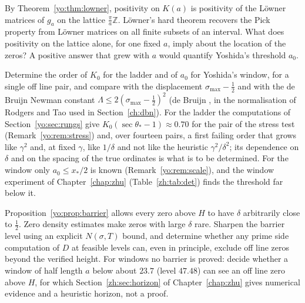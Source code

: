 \begin{problem}\label{yo:op:lowner}
By Theorem~\ref{yo:thm:lowner}, positivity on $K(a)$ is positivity of the L\"owner matrices of $g_a$ on the lattice $\frac\pi a\mathbb Z$. L\"owner's hard theorem \cite{Lowner34,Donoghue74} recovers the Pick property from L\"owner matrices on all finite subsets of an interval. What does positivity on the lattice alone, for one fixed $a$, imply about the location of the zeros? A positive answer that grew with $a$ would quantify Yoshida's threshold $a_0$.
\end{problem}

\begin{problem}\label{yo:op:orders}
Determine the order of $K_0$ for the ladder and of $a_0$ for Yoshida's window, for a single off line pair, and compare with the displacement $\sigma_{\max}-\frac12$ and with the de Bruijn Newman constant $\Lambda\le2(\sigma_{\max}-\frac12)^2$ (de Bruijn \cite{deBruijn}, in the normalisation of Rodgers and Tao \cite{RodgersTao} used in Section~\ref{ch:dbn}). For the ladder the computations of Section~\ref{yo:sec:rungs} give $K_0(\sec\theta_*-1)\approx0.70$ for the pair of the stress test (Remark~\ref{yo:rem:stress}) and, over fourteen pairs, a first failing order that grows like $\gamma^2$ and, at fixed $\gamma$, like $1/\delta$ and not like the heuristic $\gamma^2/\delta^2$; its dependence on $\delta$ and on the spacing of the true ordinates is what is to be determined. For the window only $a_0\le x_*/2$ is known (Remark~\ref{yo:rem:scale}), and the window experiment of Chapter~\ref{chap:zhu} (Table~\ref{zh:tab:det}) finds the threshold far below it.
\end{problem}

\begin{problem}\label{yo:op:density}
Proposition~\ref{yo:prop:barrier} allows every zero above $H$ to have $\delta$ arbitrarily close to $\frac12$. Zero density estimates make zeros with large $\delta$ rare. Sharpen the barrier level using an explicit $N(\sigma,T)$ bound, and determine whether any prime side computation of $D$ at feasible levels can, even in principle, exclude off line zeros beyond the verified height. For windows no barrier is proved: decide whether a window of half length $a$ below about $23.7$ (level $47.48$) can see an off line zero above $H$, for which Section~\ref{zh:sec:horizon} of Chapter~\ref{chap:zhu} gives numerical evidence and a heuristic horizon, not a proof.
\end{problem}

